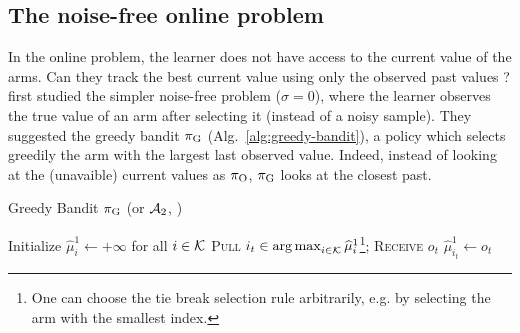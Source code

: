 \subsection{The noise-free online problem \citep{heidari2016tight}}
In the online problem, the learner does not have access to the current value of the arms. Can they track the best current value using only the observed past values ?  \citet{heidari2016tight} first studied the simpler noise-free problem ($\sigma =0$), where the learner observes the true value of an arm after selecting it (instead of a noisy sample). They suggested the greedy bandit $\pi_{\rm G}$ (Alg.~\ref{alg:greedy-bandit}), a policy which selects greedily the arm with the largest last observed value. Indeed, instead of looking at the (unavaible) current values as $\pi_{\rm O}$, $\pi_{\rm G}$ looks at the closest past. 

\begin{minipage}{\textwidth}
\renewcommand*\footnoterule{}
\begin{savenotes}
\begin{algorithm}[H]
\caption{Greedy Bandit $\pi_{\rm G}$ (or $\mathcal{A}_{\rm 2}$, \citet{heidari2016tight})}
\label{alg:greedy-bandit}
\begin{algorithmic}[1]
\Require
\State Initialize $\hat{\mu}_{i}^1 \leftarrow + \infty$ for all $i \in \mathcal{K}$
		\State \textsc{Pull} $i_t \in \operatorname*{arg\,max}_{i \in \mathcal{K}} \widehat{\mu}_{i}^1$\footnote{One can choose the tie break selection rule arbitrarily, e.g. by selecting the arm with the smallest index.}; \textsc{Receive} $o_{t}$
		\State $\hat{\mu}_{i_t}^1 \leftarrow o_{t}$
	\EndFor
\end{algorithmic}
\end{algorithm}
\end{savenotes}
\end{minipage}


